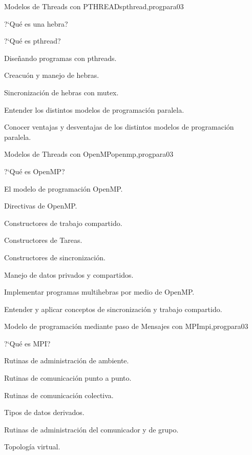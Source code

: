 \begin{syllabus}
\begin{unit}{Modelos de Threads con PTHREADs}{pthread,progpara}{0}{3}
\begin{topics}
         \item ?`Qué es una hebra?
         \item ?`Qué es  pthread?
         \item Diseñando programas con pthreads.
         \item Creacuón y manejo de hebras.
         \item Sincronización de hebras con mutex.
\end{topics}

\begin{learningoutcomes}
	\item Entender los distintos modelos de programación paralela.
	\item Conocer ventajas y desventajas de los distintos modelos de programación paralela.
\end{learningoutcomes}
\end{unit}

\begin{unit}{Modelos de Threads con OpenMP}{openmp,progpara}{0}{3}
\begin{topics}
         \item ?`Qué es OpenMP?
         \item El modelo de programación OpenMP.
         \item Directivas de OpenMP.
         \item Constructores de trabajo compartido.
         \item Constructores de Tareas.
         \item Constructores de sincronización.
	 \item Manejo de datos privados y compartidos.
\end{topics}

\begin{learningoutcomes}
	\item Implementar programas multihebras por medio de OpenMP.
	\item Entender y aplicar conceptos de sincronización y trabajo compartido.
\end{learningoutcomes}
\end{unit}

\begin{unit}{Modelo de programación mediante paso de Mensajes con MPI}{mpi,progpara}{0}{3}
\begin{topics}
         \item ?`Qué es MPI?
         \item Rutinas de administración de ambiente.
         \item Rutinas de comunicación punto a punto.
         \item Rutinas de comunicación colectiva.
         \item Tipos de datos derivados.
         \item Rutinas de administración del comunicador y de grupo.
	 \item Topología virtual.
\end{topics}


\end{unit}
\end{syllabus}
